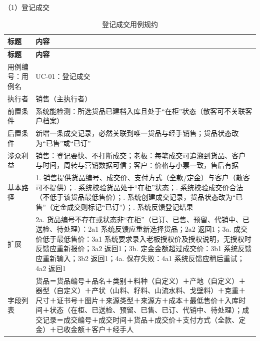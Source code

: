 \noindent（1）登记成交

{\small
\begin{longtable}{@{}L{3.0cm} L{12.3cm}@{}}
\caption{登记成交用例规约}\label{tab:uc-01}\\
\toprule
\textbf{标题} & \textbf{内容} \\
\midrule
\endfirsthead
\toprule
\textbf{标题} & \textbf{内容} \\
\midrule
\endhead
用例编号：用例名 & UC-01：登记成交 \\
\midrule
执行者 & 销售（主执行者） \\
\midrule
前置条件 & 系统能检测：所选货品已建档入库且处于“在柜”状态（散客可不关联客户档案） \\
\midrule
后置条件 & 新增一条成交记录，必然关联到唯一货品与经手销售；货品状态改为“已售”或“已订” \\
\midrule
涉众利益 & 销售：登记要快、不打断成交；\newline 老板：每笔成交可追溯到货品、客户与时间，周转与营销数据可信；\newline 客户：价格与小票一致，售后有据 \\
\midrule
基本路径 & 1. 销售提供货品编号、成交价、支付方式（全款/定金）与客户（散客可不提供）；. 系统校验货品处于“在柜”状态；. 系统校验成交价合法（不低于该货品最低售价）；. 系统创建成交记录，货品状态改为“已售”（定金成交则标记“已订”）；. 系统反馈登记结果 \\
\midrule
扩展 & 2a. 货品编号不存在或状态非“在柜”（已订、已售、预留、代销中、已送检、待处理）：2a1 系统反馈应重新选择货品；2a2 返回1；\newline 3a. 成交价低于最低售价：3a1 系统要求录入老板授权价及授权说明，无授权时反馈应重新报价；3a2 返回1；\newline 3b. 定金金额超过成交价：3b1 系统反馈应重新输入；3b2 返回1；\newline 4a. 保存失败：4a1 系统反馈应稍后重试；4a2 返回1 \\
\midrule
字段列表 & 货品＝货品编号＋品名＋类别＋料种（自定义）＋产地（自定义）＋器型（自定义）＋产状（山料、籽料、山流水料、戈壁料）＋克重＋尺寸＋证书号＋图片＋来源类型＋来源方＋成本＋最低售价＋入库时间＋状态（在柜、已送检、预留、已售、已订、代销中、待处理）；\newline 成交记录＝成交编号＋成交时间＋货品＋成交价＋支付方式（全款、定金）＋已收金额＋客户＋经手人 \\

\end{longtable}}
